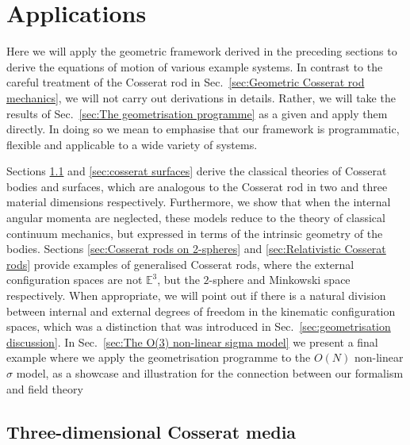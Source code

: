 \section{Applications} \label{sec:geometrisation applications}

Here we will apply the geometric framework derived in the preceding sections to derive the equations of motion of various example systems. In contrast to the careful treatment of the Cosserat rod in Sec.~\ref{sec:Geometric Cosserat rod mechanics}, we will not carry out derivations in details. Rather, we will take the results of Sec.~\ref{sec:The geometrisation programme} as a given and apply them directly. In doing so we mean to emphasise that our framework is programmatic, flexible and applicable to a wide variety of systems.

Sections \ref{sec:cosserat 3d bodies} and \ref{sec:cosserat surfaces} derive the classical theories of Cosserat bodies and surfaces, which are analogous to the Cosserat rod in two and three material dimensions respectively. Furthermore, we show that when the internal angular momenta are neglected, these models reduce to the theory of classical continuum mechanics, but expressed in terms of the intrinsic geometry of the bodies. Sections \ref{sec:Cosserat rods on 2-spheres} and \ref{sec:Relativistic Cosserat rods} provide examples of generalised Cosserat rods, where the external configuration spaces are not $\mathbb{E}^3$, but the $2$-sphere and Minkowski space respectively. When appropriate, we will point out if there is a natural division between internal and external degrees of freedom in the kinematic configuration spaces, which was a distinction that was introduced in Sec.~\ref{sec:geometrisation discussion}. In Sec.~\ref{sec:The O(3) non-linear sigma model} we present a final example where we apply the geometrisation programme to the $O(N)$ non-linear $\sigma$ model, as a showcase and illustration for the connection between our formalism and field theory


\subsection{Three-dimensional Cosserat media}  \label{sec:cosserat 3d bodies}


